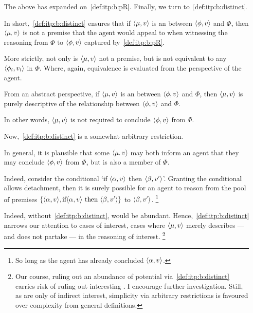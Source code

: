 \begin{note}
  The above has expanded on~\ref{def:itp:b:pR}.
  Finally, we turn to~\ref{def:itp:b:distinct}.

  In short,~\ref{def:itp:b:distinct} ensures that if \(\langle \mu, v \rangle\) is an  between \(\langle \phi, v \rangle\) and \(\Phi\), then \(\langle \mu, v \rangle\) is not a premise that the agent would appeal to when witnessing the reasoning from \(\Phi\) to \(\langle \phi, v \rangle\) captured by~\ref{def:itp:b:pR}.

  More strictly, not only is \(\langle \mu, v \rangle\) not a premise, but is not equivalent to any \(\langle \phi_{i}, v_{i} \rangle\) in \(\Phi\).
  Where, again, equivalence is evaluated from the perspective of the agent.

  From an abstract perspective, if \(\langle \mu, v \rangle\) is an  between \(\langle \phi, v \rangle\) and \(\Phi\), then \(\langle \mu, v \rangle\) is purely descriptive of the relationship between \(\langle \phi, v \rangle\) and \(\Phi\).

  In other words, \(\langle \mu, v \rangle\) is not required to conclude \(\langle \phi, v \rangle\) from \(\Phi\).

  Now,~\ref{def:itp:b:distinct} is a somewhat arbitrary restriction.

  In general, it is plausible that some \(\langle \mu, v \rangle\) may both inform an agent that they may conclude \(\langle \phi, v \rangle\) from \(\Phi\), but is also a member of \(\Phi\).

  Indeed, consider the conditional `if \(\langle \alpha, v \rangle\) then \(\langle \beta, v' \rangle\)'.
  Granting the conditional allows detachment, then it is surely possible for an agent to reason from the pool of premises \(\{\langle \alpha, v \rangle, \text{if} \langle \alpha, v \rangle \text{ then } \langle \beta, v' \rangle\}\) to \(\langle \beta, v' \rangle\).%
  \footnote{
    So long as the agent has already concluded \(\langle \alpha, v \rangle\).
  }

  Indeed, without~\ref{def:itp:b:distinct},  would be abundant.
  Hence,~\ref{def:itp:b:distinct} narrows our attention to cases of interest, cases where \(\langle \mu, v \rangle\) merely describes --- and does not partake --- in the reasoning of interest.%
  \footnote{
    Our course, ruling out an abundance of potential  via~\ref{def:itp:b:distinct} carries risk of ruling out interesting .
    I encourage further investigation.
    Still, as  are only of indirect interest, simplicity via arbitrary restrictions is favoured over complexity from general definitions.
  }
\end{note}

